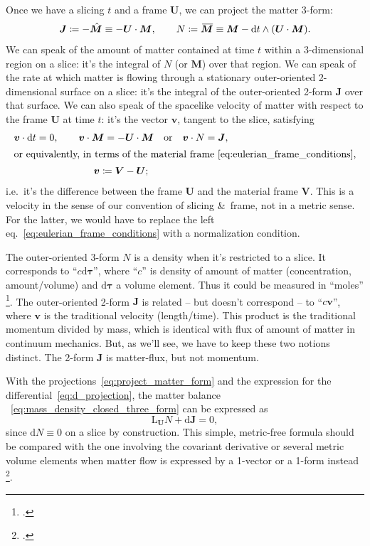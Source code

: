 \documentclass[\ifafour a4paper,12pt,\else a5paper,10pt,\fi%
onecolumn,oneside,article,%
british%
]{memoir}
\theoremstyle{remark}
\theoremstyle{innote}
\newcommand*{\citep}{\footcites}
\newcommand*{\amp}{\&}
\newcommand*{\di}{\mathrm{d}}%
\newcommand*{\defd}{\coloneqq}
\renewcommand*{\|}[1][]{\nonscript\,#1\vert\nonscript\;\mathopen{}}
\newcommand*{\sect}{\S}%
\newcommand*{\eqn}{eq.}%
\newcommand*{\eg}{{e.g.}}
\newcommand*{\ie}{{i.e.}}
\newcommand*{\widebar}[1]{{\mkern1.5mu\skew{2}\overline{\mkern-1.5mu#1\mkern-1.5mu}\mkern 1.5mu}}
\newcommand*{\Li}{\mathrm{L}}
\newcommand*{\yd}{N}
\newcommand*{\yrr}{M}
\newcommand*{\yr}{\bm{\yrr}}
\newcommand*{\yjj}{J}
\newcommand*{\yj}{\bm{\yjj}}
\newcommand*{\yvvt}{v}
\newcommand*{\yvt}{\bm{\yvvt}}
\newcommand*{\yFF}{U}
\newcommand*{\yF}{\bm{\yFF}}
\newcommand*{\ynn}{V}
\newcommand*{\yn}{\bm{\ynn}}
\begin{document}
Once we have a slicing $t$ and a frame $\yF$, we can project the matter
3-form:
\begin{equation}
  \label{eq:project_matter_form}
  \yj \defd  -\Hat{\yr} \equiv -\yF\cdot\yr,
  \qquad
  \yd \defd \widebar{\yr} \equiv \yr - \di t \land (\yF\cdot\yr).
\end{equation}
We can speak of the amount of matter contained at time $t$ within a
3-dimensional region on a slice: it's the integral of $\yd$ (or $\yr$) over
that region. We can speak of the rate at which matter is flowing through a
stationary outer-oriented 2-dimensional surface on a slice: it's the
integral of the outer-oriented 2-form $\yj$ over that surface. We can also
speak of the spacelike velocity of matter with respect to the frame $\yF$
at time $t$: it's the vector $\yvt$, tangent to the slice, satisfying
\begin{subequations}
  \label{eq:matter_velocity_in_frame}
  \begin{gather}
    \yvt \cdot \di t = 0, \qquad
    \yvt \cdot \yr = - \yF \cdot \yr
    \quad\text{or}\quad
    \yvt \cdot \yd = \yj,
    \\
    \shortintertext{or equivalently, in terms of the material frame~\eqref{eq:eulerian_frame_conditions},}
    \yvt \defd \yn-\yF;
  \end{gather}
\end{subequations}
\ie\ it's the difference between the frame $\yF$ and the material frame
$\yn$. This is a velocity in the sense of our convention of slicing \amp\
frame, not in a metric sense. For the latter, we would have to replace
the left \eqn~\eqref{eq:eulerian_frame_conditions} with a normalization
condition.

The outer-oriented 3-form $\yd$ is a density when it's restricted to a
slice. It corresponds to \enquote{$c\di\bm{\tau}$}, where \enquote{$c$} is
density of amount of matter (concentration, amount/volume) and
{$\di\bm{\tau}$} a volume element. Thus it could be measured in
\enquote{moles} \citep{iso2009,iso2009d,jcgm1997_r2012}. The outer-oriented
2-form $\yj$ is related -- but doesn't correspond -- to
\enquote{$c\bm{v}$}, where {$\bm{v}$} is the traditional velocity
(length/time). This product is the traditional momentum divided by mass,
which is identical with flux of amount of matter in continuum mechanics.
But, as we'll see, we have to keep these two notions distinct. The 2-form
$\yj$ is matter-flux, but not momentum.

With the projections~\eqref{eq:project_matter_form} and the expression for
the differential~\eqref{eq:d_projection}, the 
matter balance ~\eqref{eq:mass_density_closed_three_form} can be expressed as
\begin{equation}
  \label{eq:mass_balance_traditional}
  \Li_{\yF}\yd + \di\yj = 0,
\end{equation}
since $\di\yd\equiv 0$ on a slice by construction. This simple, metric-free
formula should be compared with the one involving the covariant derivative
or several metric volume elements when matter flow is expressed by a
1-vector or a 1-form instead \citep[\eg][\eqn~(7.205), \sect~7.3,
p.~361]{rezzollaetal2013}[\eqn~(6.47), \sect~6.3.2,
p.~110]{gourgoulhon2007_r2012}.
\end{document}
